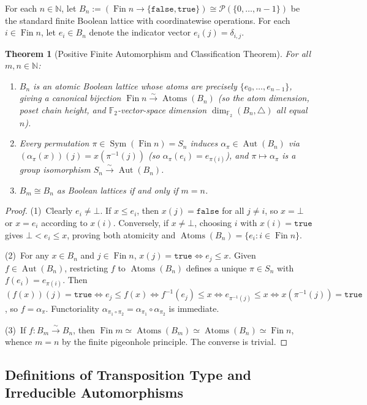 \documentclass[11pt]{article}
\newtheorem{theorem}{Theorem}[section]
\theoremstyle{definition}
\theoremstyle{remark}
\newcommand{\Aut}{\operatorname{Aut}}
\newcommand{\Sym}{\operatorname{Sym}}
\newcommand{\Atoms}{\operatorname{Atoms}}
\newcommand{\Fin}{\operatorname{Fin}}
\newcommand{\Ftwo}{\mathbb{F}_2}
\newcommand{\N}{\mathbb{N}}
\begin{document}
For each $n \in \N$, let $B_n := (\Fin n \to \{\mathtt{false}, \mathtt{true}\}) \cong \mathcal{P}(\{0, \dots, n-1\})$ be the standard finite Boolean lattice with coordinatewise operations. For each $i \in \Fin n$, let $e_i \in B_n$ denote the indicator vector $e_i(j) = \delta_{i,j}$.

\begin{theorem}[Positive Finite Automorphism and Classification Theorem]
\label{thm:finite-positive}
For all $m, n \in \N$:
\begin{enumerate}
  \item $B_n$ is an atomic Boolean lattice whose atoms are precisely $\{e_0, \dots, e_{n-1}\}$, giving a canonical bijection $\Fin n \xrightarrow{\sim} \Atoms(B_n)$ (so the atom dimension, poset chain height, and $\Ftwo$-vector-space dimension $\dim_{\Ftwo}(B_n, \triangle)$ all equal $n$).
  \item Every permutation $\pi \in \Sym(\Fin n) = S_n$ induces $\alpha_\pi \in \Aut(B_n)$ via $(\alpha_\pi(x))(j) = x(\pi^{-1}(j))$ (so $\alpha_\pi(e_i) = e_{\pi(i)}$), and $\pi \mapsto \alpha_\pi$ is a group isomorphism $S_n \xrightarrow{\sim} \Aut(B_n)$.
  \item $B_m \cong B_n$ as Boolean lattices if and only if $m = n$.
\end{enumerate}
\end{theorem}
\begin{proof}
(1)~Clearly $e_i \neq \bot$. If $x \le e_i$, then $x(j) = \mathtt{false}$ for all $j \neq i$, so $x = \bot$ or $x = e_i$ according to $x(i)$. Conversely, if $x \neq \bot$, choosing $i$ with $x(i) = \mathtt{true}$ gives $\bot < e_i \le x$, proving both atomicity and $\Atoms(B_n) = \{e_i : i \in \Fin n\}$.

(2)~For any $x \in B_n$ and $j \in \Fin n$, $x(j) = \mathtt{true} \iff e_j \le x$. Given $f \in \Aut(B_n)$, restricting $f$ to $\Atoms(B_n)$ defines a unique $\pi \in S_n$ with $f(e_i) = e_{\pi(i)}$. Then $(f(x))(j) = \mathtt{true} \iff e_j \le f(x) \iff f^{-1}(e_j) \le x \iff e_{\pi^{-1}(j)} \le x \iff x(\pi^{-1}(j)) = \mathtt{true}$, so $f = \alpha_\pi$. Functoriality $\alpha_{\pi_1 \circ \pi_2} = \alpha_{\pi_1} \circ \alpha_{\pi_2}$ is immediate.

(3)~If $f : B_m \xrightarrow{\sim} B_n$, then $\Fin m \simeq \Atoms(B_m) \simeq \Atoms(B_n) \simeq \Fin n$, whence $m = n$ by the finite pigeonhole principle. The converse is trivial.
\end{proof}

\subsection{Definitions of Transposition Type and Irreducible Automorphisms}
\end{document}
